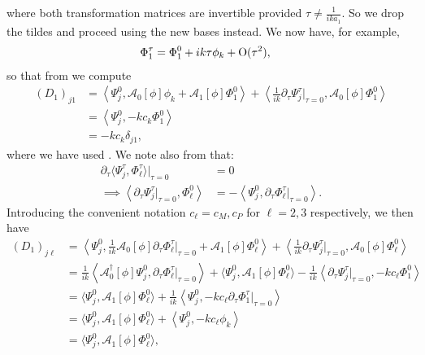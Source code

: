 \documentclass[11pt,leqno]{article}
\numberwithin{equation}{section}
\theoremstyle{definition}
\begin{document}
where both transformation matrices are invertible provided $ \tau \neq \frac{1}{ika_{1}} $. So we drop the tildes and proceed using the new bases instead. We now have, for example,
\begin{align*}
	\Phi_{1}^{\tau} &= \Phi_{1}^{0} + ik\tau\phi_{k} + \rm O(\tau^{2}),
\end{align*}
so that from  we compute
\begin{align*}
	(D_{1})_{j1} &= \left\langle\Psi_{j}^{0}, \mathcal{A}_{0}[\phi]\phi_{k} + \mathcal{A}_{1}[\phi]\Phi_{1}^{0}\right\rangle + \left\langle\frac{1}{ik}\partial_{\tau}\Psi_{j}^{\tau}\bigg|_{\tau = 0},\mathcal{A}_{0}[\phi]\Phi_{1}^{0} \right\rangle\\
	&= \left\langle\Psi_{j}^{0}, -kc_{k}\Phi_{1}^{0}\right\rangle\\
	&= -kc_{k}\delta_{j1},
\end{align*}
where we have used . We note also from  that:
\begin{align*}
	\partial_{\tau}\langle\Psi_{j}^{\tau},\Phi_{\ell}^{\tau} \rangle\big|_{\tau = 0} &= 0\\
	\implies \left\langle\partial_{\tau}\Psi_{j}^{\tau}\big|_{\tau = 0}, \Phi_{\ell}^{0} \right\rangle &= - \left \langle\Psi_{j}^{0},\partial_{\tau}\Phi_{\ell}^{\tau}\big|_{\tau = 0} \right \rangle.
\end{align*}
Introducing the convenient notation $ c_{\ell} = c_{M}, c_{P} $ for $ \ell = 2,3 $ respectively, we then have
\begin{align*}
	(D_{1})_{j\ell} &= \left\langle\Psi_{j}^{0}, \frac{1}{ik}\mathcal{A}_{0}[\phi]\partial_{\tau}\Phi_{\ell}^{\tau}\bigg|_{\tau = 0} + \mathcal{A}_{1}[\phi]\Phi_{\ell}^{0}\right\rangle + \left\langle\frac{1}{ik}\partial_{\tau}\Psi_{j}^{\tau}\bigg|_{\tau = 0},\mathcal{A}_{0}[\phi]\Phi_{\ell}^{0} \right\rangle\\
	&= \frac{1}{ik}\left\langle\mathcal{A}_{0}^{\dagger}[\phi]\Psi_{j}^{0}, \partial_{\tau}\Phi_{\ell}^{\tau}\big|_{\tau = 0}\right\rangle + \langle\Psi_{j}^{0},  \mathcal{A}_{1}[\phi]\Phi_{\ell}^{0}\rangle - \frac{1}{ik}\left\langle\partial_{\tau}\Psi_{j}^{\tau}\big|_{\tau = 0},-kc_{\ell}\Phi_{1}^{0} \right\rangle\\
	&= \langle\Psi_{j}^{0},  \mathcal{A}_{1}[\phi]\Phi_{\ell}^{0}\rangle + \frac{1}{ik}\left\langle\Psi_{j}^{0},-kc_{\ell}\partial_{\tau}\Phi_{1}^{\tau}\big|_{\tau = 0} \right\rangle\\
	&= \langle\Psi_{j}^{0},  \mathcal{A}_{1}[\phi]\Phi_{\ell}^{0}\rangle + \left\langle\Psi_{j}^{0},-kc_{\ell}\phi_{k}\right\rangle\\
	&= \langle\Psi_{j}^{0},  \mathcal{A}_{1}[\phi]\Phi_{\ell}^{0}\rangle,
\end{align*}
\end{document}
